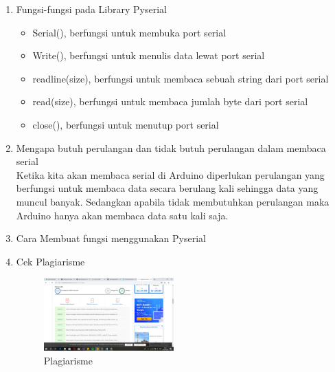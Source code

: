 \begin{enumerate}
\item Fungsi-fungsi pada Library Pyserial
\begin{itemize}
\item Serial(), berfungsi untuk membuka port serial
\item Write(), berfungsi untuk menulis data lewat port serial
\item readline(size), berfungsi untuk membaca sebuah string dari port serial
\item read(size), berfungsi untuk membaca jumlah byte dari port serial
\item close(), berfungsi untuk menutup port serial
\end{itemize}

\item Mengapa butuh perulangan dan tidak butuh perulangan dalam membaca serial\\
Ketika kita akan membaca serial di Arduino diperlukan perulangan yang berfungsi untuk membaca data secara berulang kali sehingga data yang muncul banyak. Sedangkan apabila tidak membutuhkan perulangan maka Arduino hanya akan membaca data satu kali saja.

\item Cara Membuat fungsi menggunakan Pyserial


\item Cek Plagiarisme
\begin{figure}[ht!]
\includegraphics[width=5cm]{figures/5/1174054/plagiarisme.png}
\centering
\caption{Plagiarisme}
\end{figure}

\end{enumerate}

